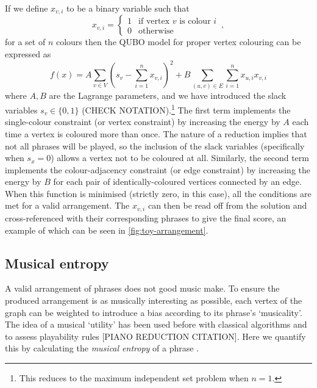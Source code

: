 \documentclass[12pt]{article}
\theoremstyle{definition}
\begin{document}
If we define $x_{v,i}$ to be a binary variable such that
\begin{equation}
    x_{v,i} =
    \begin{cases}
        1 & \text{if vertex $v$ is colour $i$} \\
        0 & \text{otherwise}
    \end{cases}
    \,,
\end{equation}
for a set of $n$ colours then the QUBO model for proper vertex colouring can be expressed as
\begin{equation}
    f(x)=A\sum_{v \in V}\left(s_v-\sum_{i=1}^{n} x_{v,i}\right)^2+B\sum_{(u,v) \in E}\sum_{i=1}^n x_{u,i}x_{v,i}
    \label{eq:colouring}
\end{equation}
where $A,B$ are the Lagrange parameters, and we have introduced the slack variables $s_v\in\{0,1\}$ (CHECK NOTATION).\footnote{This reduces to the maximum independent set problem when $n=1$.} The first term implements the single-colour constraint (or vertex constraint) by increasing the energy by $A$ each time a vertex is coloured more than once. The nature of a reduction implies that not all phrases will be played, so the inclusion of the slack variables (specifically when $s_x=0$) allows a vertex not to be coloured at all. Similarly, the second term implements the colour-adjacency constraint (or edge constraint) by increasing the energy by $B$ for each pair of identically-coloured vertices connected by an edge. When this function is minimised (strictly zero, in this case), all the conditions are met for a valid arrangement. The $x_{v,i}$ can then be read off from the solution and cross-referenced with their corresponding phrases to give the final score, an example of which can be seen in \cref{fig:toy-arrangement}.

\subsection{Musical entropy}

A valid arrangement of phrases does not good music make. To ensure the produced arrangement is as musically interesting as possible, each vertex of the graph can be weighted to introduce a bias according to its phrase's `musicality'. The idea of a musical `utility' has been used before with classical algorithms \cite{huang_towards_2012} and to assess playability rules [PIANO REDUCTION CITATION]. Here we quantify this by calculating the \emph{musical entropy} of a phrase \cite{li_entropy_2019}.
\end{document}
